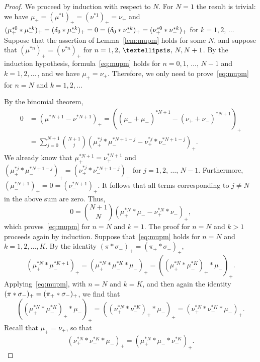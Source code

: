 \documentclass[11pt]{article}
\theoremstyle{definition}
\numberwithin{equation}{section}
\numberwithin{figure}{section}
\numberwithin{table}{section}
\begin{document}
\begin{proof}
We proceed by induction with respect to $N$. For $N = 1$ the result is trivial: we have $\mu_+ = (\mu^{*1})_+ = (\nu^{*1})_+ = \nu_+$ and $(\mu_+^{*0} * \mu_-^{*k})_+ = (\delta_0 * \mu_-^{*k})_+ = 0\linebreak= (\delta_0 * \nu_-^{*k})_+ = (\nu_+^{*0} * \nu_-^{*k})_+$ for $k = 1, 2,\,\ldots\,$ Suppose that the assertion of Lemma~\ref{lem:mupm} holds for some $N$, and suppose that $(\mu^{*n})_+ = (\nu^{*n})_+$ for $n = 1, 2,\,\ldots,\,N,\linebreak N + 1$. By the induction hypothesis, formula~\eqref{eq:mupm} holds for $n = 0, 1,\,\ldots,\,N - 1$ and $k = 1, 2, \ldots\,$, and we have $\mu_+ = \nu_+$. Therefore, we only need to prove~\eqref{eq:mupm} for $n = N$ and $k = 1, 2, \ldots$

By the binomial theorem,
\begin{align*}
0 & = \left(\mu^{*N + 1} - \nu^{*N + 1}\right)_+ = \left((\mu_+ + \mu_-)^{*N + 1} - (\nu_+ + \nu_-)^{*N + 1}\right)_+ \\
& = \sum_{j = 0}^{N + 1} \binom{N + 1}{j} \left(\mu_+^{*j} * \mu_-^{*N + 1 - j} - \nu_+^{*j} * \nu_-^{*N + 1 - j}\right)_+. 
\end{align*} 
We already know that $\mu_+^{*N + 1} = \nu_+^{*N + 1}$ and $(\mu_+^{*j} * \mu_-^{*N + 1 - j})_+ = (\nu_+^{*j} * \nu_-^{*N + 1 - j})_+$ for $j = 1, 2,\,\ldots,\,N - 1$. Furthermore, $(\mu_-^{*N + 1})_+ = 0 = (\nu_-^{*N + 1})_+$. It follows that all terms corresponding to $j \ne N$ in the above sum are zero. Thus,
\[
0 = \binom{N + 1}{N} \left(\mu_+^{*N} * \mu_- - \nu_+^{*N} * \nu_-\right)_+,
\]
which proves~\eqref{eq:mupm} for $n = N$ and $k = 1$. The proof for $n = N$ and $k > 1$ proceeds again by induction. Suppose that~\eqref{eq:mupm} holds for $n = N$ and $k = 1, 2, \ldots, K$. By the identity $(\pi * \sigma_-)_+ = (\pi_+ * \sigma_-)_+$,
\[
\left(\mu_+^{*N} * \mu_-^{*K + 1}\right)_+ = \left(\mu_+^{*N} * \mu_-^{*K} * \mu_-\right)_+ = \left(\left(\mu_+^{*N} * \mu_-^{*K}\right)_+ * \mu_-\right)_+.
\]
Applying~\eqref{eq:mupm}, with $n = N$ and $k = K$, and then again the identity $(\pi * \sigma_-)_+\linebreak= (\pi_+ * \sigma_-)_+$, we find that
\[
\left(\left(\mu_+^{*N} * \mu_-^{*K}\right)_+ * \mu_-\right)_+ = \left(\left(\nu_+^{*N} * \nu_-^{*K}\right)_+ * \mu_-\right)_+ = \left(\nu_+^{*N} * \nu_-^{*K} * \mu_-\right)_+.
\]
Recall that $\mu_+ = \nu_+$, so that
\[
\left(\nu_+^{*N} * \nu_-^{*K} * \mu_-\right)_+ = \left(\mu_+^{*N} * \mu_- * \nu_-^{*K}\right)_+.
\]
\end{proof}
\end{document}
